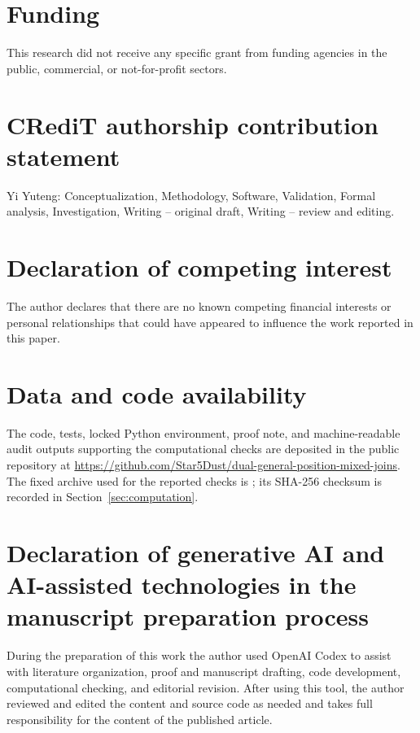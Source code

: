 \documentclass[preprint,12pt]{elsarticle}
\numberwithin{equation}{section}
\begin{document}
\section*{Funding}
This research did not receive any specific grant from funding agencies in the
public, commercial, or not-for-profit sectors.

\section*{CRediT authorship contribution statement}
Yi Yuteng: Conceptualization, Methodology, Software, Validation, Formal
analysis, Investigation, Writing -- original draft, Writing -- review and
editing.

\section*{Declaration of competing interest}
The author declares that there are no known competing financial interests or
personal relationships that could have appeared to influence the work reported
in this paper.

\section*{Data and code availability}
The code, tests, locked Python environment, proof note, and machine-readable
audit outputs supporting the computational checks are deposited in the public
repository at
\url{https://github.com/Star5Dust/dual-general-position-mixed-joins}. The fixed
archive used for the reported checks is
; its SHA-256 checksum is
recorded in Section~\ref{sec:computation}.

\section*{Declaration of generative AI and AI-assisted technologies in the
manuscript preparation process}
During the preparation of this work the author used OpenAI Codex to assist with
literature organization, proof and manuscript drafting, code development,
computational checking, and editorial revision. After using this tool, the
author reviewed and edited the content and source code as needed and takes full
responsibility for the content of the published article.
\end{document}
